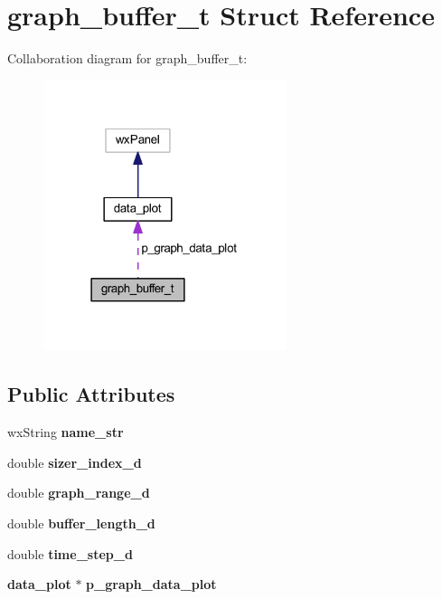 \section{graph\+\_\+buffer\+\_\+t Struct Reference}
\label{structgraph__buffer__t}


Collaboration diagram for graph\+\_\+buffer\+\_\+t\+:
\nopagebreak
\begin{figure}[H]
\begin{center}
\leavevmode
\includegraphics[width=202pt]{structgraph__buffer__t__coll__graph}
\end{center}
\end{figure}
\subsection*{Public Attributes}
\begin{DoxyCompactItemize}
\item 
\mbox{\label{structgraph__buffer__t_ae14f7c6636315afc69db0604a99830eb}} 
wx\+String {\bfseries name\+\_\+str}
\item 
\mbox{\label{structgraph__buffer__t_a5f42c146a3155bb1ef631d50967e8cd1}} 
double {\bfseries sizer\+\_\+index\+\_\+d}
\item 
\mbox{\label{structgraph__buffer__t_a1515c711062fdb2d5ff66cc57a222ac8}} 
double {\bfseries graph\+\_\+range\+\_\+d}
\item 
\mbox{\label{structgraph__buffer__t_a582504e1b18729b42be8368f93c45c31}} 
double {\bfseries buffer\+\_\+length\+\_\+d}
\item 
\mbox{\label{structgraph__buffer__t_ab224e2dfdefc1937134b17f890362689}} 
double {\bfseries time\+\_\+step\+\_\+d}
\item 
\mbox{\label{structgraph__buffer__t_a18ffbff80268176c952637c2336d5dbf}} 
\textbf{ data\+\_\+plot} $\ast$ {\bfseries p\+\_\+graph\+\_\+data\+\_\+plot}
\end{DoxyCompactItemize}


